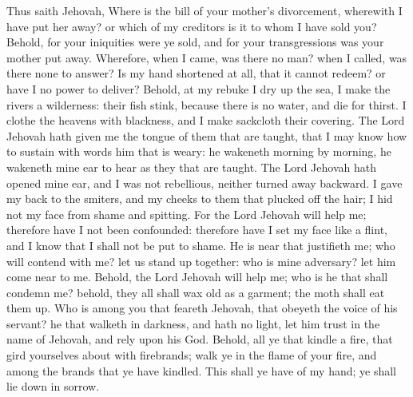 Thus saith Jehovah, Where is the bill of your mother’s divorcement, wherewith I have put her away? or which of my creditors is it to whom I have sold you? Behold, for your iniquities were ye sold, and for your transgressions was your mother put away. Wherefore, when I came, was there no man? when I called, was there none to answer? Is my hand shortened at all, that it cannot redeem? or have I no power to deliver? Behold, at my rebuke I dry up the sea, I make the rivers a wilderness: their fish stink, because there is no water, and die for thirst. I clothe the heavens with blackness, and I make sackcloth their covering.  The Lord Jehovah hath given me the tongue of them that are taught, that I may know how to sustain with words him that is weary: he wakeneth morning by morning, he wakeneth mine ear to hear as they that are taught. The Lord Jehovah hath opened mine ear, and I was not rebellious, neither turned away backward. I gave my back to the smiters, and my cheeks to them that plucked off the hair; I hid not my face from shame and spitting. For the Lord Jehovah will help me; therefore have I not been confounded: therefore have I set my face like a flint, and I know that I shall not be put to shame. He is near that justifieth me; who will contend with me? let us stand up together: who is mine adversary? let him come near to me. Behold, the Lord Jehovah will help me; who is he that shall condemn me? behold, they all shall wax old as a garment; the moth shall eat them up.  Who is among you that feareth Jehovah, that obeyeth the voice of his servant? he that walketh in darkness, and hath no light, let him trust in the name of Jehovah, and rely upon his God. Behold, all ye that kindle a fire, that gird yourselves about with firebrands; walk ye in the flame of your fire, and among the brands that ye have kindled. This shall ye have of my hand; ye shall lie down in sorrow. 

